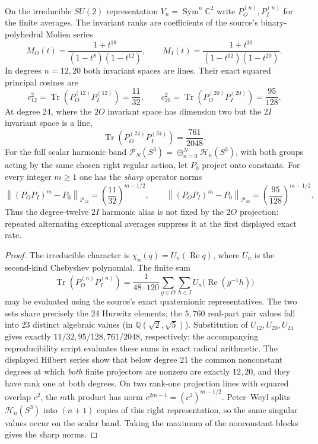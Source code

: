 \documentclass[11pt]{article}
\begin{document}
\begin{theorem}
\label{p1b:thm:cc15-exceptional-character-overlap}
On the irreducible $SU(2)$ representation $V_n=\operatorname{Sym}^n\mathbb C^2$
write $P_O^{(n)},P_I^{(n)}$ for the finite averages. The invariant
ranks are coefficients of the source's binary-polyhedral Molien series
\[
 M_O(t)=\frac{1+t^{18}}{(1-t^8)(1-t^{12})},\qquad
 M_I(t)=\frac{1+t^{30}}{(1-t^{12})(1-t^{20})}.
\]
In degrees $n=12,20$ both invariant spaces are lines. Their exact
squared principal cosines are
\[\boxed{c_{12}^2=\operatorname{Tr}(P_O^{(12)}P_I^{(12)})=\frac{11}{32},
\qquad c_{20}^2=\operatorname{Tr}(P_O^{(20)}P_I^{(20)})=\frac{95}{128}.}\]
At degree $24$, where the $2O$ invariant space has dimension two but
the $2I$ invariant space is a line,
\[\boxed{\operatorname{Tr}(P_O^{(24)}P_I^{(24)})=\frac{761}{2048}.}\]
For the full scalar harmonic band $\mathcal P_N(S^3)=\oplus_{n=0}^N\mathcal H_n(S^3)$,
with both groups acting by the same chosen right regular action, let
$P_0$ project onto constants. For every integer $m\ge1$ one has the
\emph{sharp} operator norms
\[
 \boxed{\left\|(P_OP_I)^m-P_0\right\|_{\mathcal P_{12}}
   =\left(\frac{11}{32}\right)^{m-1/2},\qquad
 \left\|(P_OP_I)^m-P_0\right\|_{\mathcal P_{20}}
   =\left(\frac{95}{128}\right)^{m-1/2}.}
\]
Thus the degree-twelve $2I$ harmonic alias is not fixed by the $2O$
projection: repeated alternating exceptional averages suppress it at
the first displayed exact rate.
\end{theorem}
\begin{proof}
The irreducible character is $\chi_n(q)=U_n(\operatorname{Re}q)$,
where $U_n$ is the second-kind Chebyshev polynomial. The finite sum
\[
 \operatorname{Tr}(P_O^{(n)}P_I^{(n)})=
 \frac1{48\cdot120}\sum_{g\in O}\sum_{h\in I}
 U_n\bigl(\operatorname{Re}(g^{-1}h)\bigr)
\]
may be evaluated using the source's exact quaternionic representatives.
The two sets share precisely the 24 Hurwitz elements; the $5,760$
real-part pair values fall into 23 distinct algebraic values
(in $\mathbb Q(\sqrt2,\sqrt5)$).  Substitution of $U_{12},U_{20},U_{24}$
gives exactly $11/32,95/128,761/2048$, respectively; the accompanying
reproducibility script evaluates these sums in exact radical arithmetic.
The displayed Hilbert series show that below degree 21 the common
nonconstant degrees at which \emph{both} finite projectors are nonzero
are exactly $12,20$, and they have rank one at both degrees. On two
rank-one projection lines with squared overlap $c^2$, the $m$th
product has norm $c^{2m-1}=(c^2)^{m-1/2}$.
Peter--Weyl splits $\mathcal H_n(S^3)$ into $(n+1)$ copies of this
right representation, so the same singular values occur on the scalar band.
Taking the maximum of the nonconstant blocks gives the sharp norms.
\end{proof}
\end{document}
